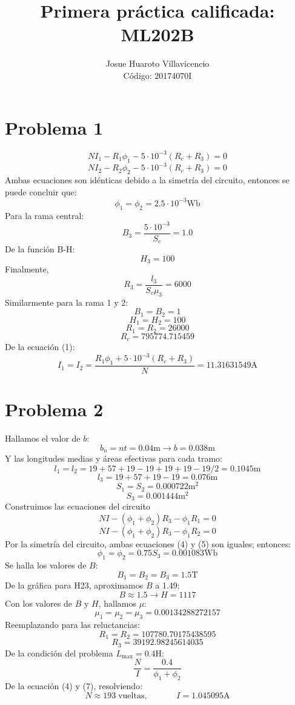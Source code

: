 \documentclass[a4paper,12pt]{article}
\title{Primera práctica calificada: ML202B}
\author{Josue Huaroto Villavicencio\\
Código: 20174070I}
\newcommand{\mrm}{\mathrm}
\begin{document}
\maketitle
\section*{Problema 1}
\begin{equation}
NI_{1} - R_{1}\phi_{1} - 5\cdot 10^{-3}(R_{c}+R_{3}) = 0
\end{equation}
\begin{equation}
NI_{2} - R_{2}\phi_{2} - 5\cdot 10^{-3}(R_{c}+R_{3}) = 0
\end{equation}
Ambas ecuaciones son idénticas debido a la simetría del circuito, entonces se puede concluir que:
\begin{equation}
\phi_{1} = \phi_{2} = 2.5\cdot 10^{-3} \mathrm{Wb}
\end{equation}
Para la rama central:
$$
B_{3} = \frac{5\cdot 10^{-3}}{S_{c}} = 1.0
$$
De la función B-H:
$$
H_{3} = 100
$$
Finalmente,
$$
R_{3} = \frac{l_{3}}{S_{c}\mu_{3}} = 6000
$$
Similarmente para la rama 1 y 2:
$$
B_{1} = B_{2} = 1
$$
$$
H_{1} = H_{2} = 100
$$
$$
R_{1} = R_{2} = 26000
$$
$$
R_{c} = 795774.715459
$$
De la ecuación (1):
$$
I_{1} = I_{2} = \frac{R_{1}\phi_{1} + 5\cdot 10^{-3} (R_{c} + R_{3})}{N} = 11.31631549 \text{A}
$$
\section*{Problema 2}
Hallamos el valor de $b$:
$$
b_{n} = nt = 0.04\mrm{m} \longrightarrow b = 0.038\mrm{m}
$$
Y las longitudes medias y áreas efectivas para cada tramo:
$$
l_{1} = l_{2} = 19+57+19-19+19+19-19/2 = 0.1045 \mrm{m}
$$
$$
l_{3} = 19+57+19-19 = 0.076 \mrm{m}
$$
$$
S_{1} = S_{2} = 0.000722 \mrm{m}^{2}
$$
$$
S_{3} = 0.001444 \mrm{m}^{2}
$$
Construimos las ecuaciones del circuito
\begin{equation}
NI - (\phi_{1}+\phi_{2})R_{3} - \phi_{1}R_{1} = 0
\end{equation}
\begin{equation}
NI - (\phi_{1}+\phi_{2})R_{3} - \phi_{1}R_{2} = 0
\end{equation}
Por la simetría del circuito, ambas ecuaciones (4) y (5) son iguales; entonces:
\begin{equation}
\phi_{1} = \phi_{2} = 0.75S_{3} = 0.001083 \mrm{Wb}
\end{equation}
Se halla los valores de $B$:
$$
B_{1} = B_{2} = B_{3} = 1.5\mrm{T}
$$
De la gráfica para H23, aproximamos $B$ a 1.49:
$$
B \approx 1.5 \longrightarrow H = 1117
$$
Con los valores de $B$ y $H$, hallamos $\mu$:
$$
\mu_{1} = \mu_{2} = \mu_{3} = 0.00134288272157
$$
Reemplazando para las reluctancias:
$$
R_{1} = R_{2} = 107780.70175438595
$$
$$
R_{3} = 39192.98245614035
$$
De la condición del problema $L_{\max} = 0.4\mrm{H}$:
\begin{equation}
    \frac{N}{I} = \frac{0.4}{\phi_{1}+\phi_{2}}
\end{equation}
De la ecuación (4) y (7), resolviendo:
\begin{equation}
    N \approx 193\;\mrm{vueltas}, \hspace{40pt} I = 1.045095 \mrm{A}
\end{equation}
\end{document}
